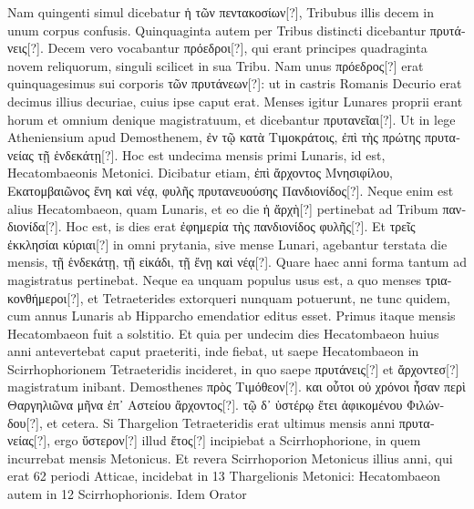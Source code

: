Nam quingenti simul dicebatur \textgreek{ἡ τῶν πεντακοσίων[?]}, Tribubus
illis decem in unum corpus confusis.
Quinquaginta autem
per Tribus distincti dicebantur \textgreek{πρυτάνεις[?]}.
Decem vero vocabantur
\textgreek{πρόεδροι[?]}, qui erant principes quadraginta novem
 reliquorum, singuli
scilicet in sua Tribu.
Nam unus \textgreek{πρόεδρος[?]} erat quinquagesimus sui
corporis \textgreek{τῶν πρυτάνεων[?]}: ut in castris Romanis Decurio erat
 decimus
illius decuriae, cuius ipse caput erat.
Menses igitur Lunares proprii
erant horum et omnium denique magistratuum, et dicebantur
 \textgreek{πρυτανεῖαι[?]}.
Ut in lege Atheniensium apud Demosthenem,
 \textgreek{ἐν τῷ κατὰ Τιμοκράτοις,
ἐπὶ τὴς πρώτης πρυτανείας τῇ ἑνδεκάτῃ[?]}.
Hoc est undecima mensis
primi Lunaris, id est, Hecatombaeonis Metonici.
Dicibatur etiam,
\textgreek{ἐπὶ ἄρχοντος Μνησιφίλου, Εκατομβαιῶνος ἕνη καὶ νέᾳ,
 φυλῆς πρυτανευούσης
Πανδιονίδος[?]}.
Neque enim est alius Hecatombaeon, quam Lunaris, et eo
die \textgreek{ἡ ἄρχὴ[?]} pertinebat ad Tribum \textgreek{πανδιονίδα[?]}.
Hoc est, is dies erat \textgreek{ἐφημερία
τὴς πανδιονίδος φυλῆς[?]}.
Et \textgreek{τρεῖς ἐκκλησίαι κύριαι[?]} in omni prytania, sive
mense Lunari, agebantur terstata die mensis,
 \textgreek{τῇ ἑνδεκάτῃ, τῇ εἰκάδι, τῇ
ἔνῃ καὶ νέᾳ[?]}.
Quare haec anni forma tantum ad magistratus pertinebat.
Neque
ea unquam populus usus est, a quo menses \textgreek{τριακονθήμεροι[?]},
 et Tetraeterides
extorqueri nunquam potuerunt, ne tunc quidem, cum annus Lunaris
ab Hipparcho emendatior editus esset.
Primus itaque mensis Hecatombaeon
fuit a solstitio.
Et quia per undecim dies Hecatombaeon
huius anni antevertebat caput praeteriti, inde fiebat, ut saepe Hecatombaeon
in Scirrhophorionem Tetraeteridis incideret, in quo saepe
 \textgreek{πρυτάνεις[?]}
et \textgreek{ἄρχοντεσ[?]} magistratum inibant.
Demosthenes \textgreek{πρὸς Τιμόθεον[?]}.
\textgreek{και οὗτοι
οὑ χρόνοι ἦσαν περὶ Θαργηλιῶνα μῆνα ἐπ᾽ Αστείου ἄρχοντος[?]}.
\textgreek{τῷ δ᾽ ὑστέρῳ ἔτει ἀφικομένου
Φιλώνδου[?]}, et cetera.
Si Thargelion Tetraeteridis erat ultimus mensis anni
\textgreek{πρυτανείας[?]}, ergo \textgreek{ὕστερον[?]} illud
 \textgreek{ἔτος[?]} incipiebat a Scirrhophorione, in
quem incurrebat mensis Metonicus.
Et revera Scirrhoporion Metonicus
illius anni, qui erat 62 periodi Atticae, incidebat in 13 Thargelionis
Metonici: Hecatombaeon autem in 12 Scirrhophorionis.
Idem Orator
